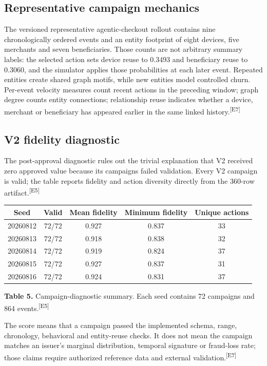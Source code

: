 \documentclass[11pt,a4paper,oneside]{article}
\newcommand{\evidence}[1]{\textsuperscript{\textcolor{EvidenceGray}{[#1]}}}
\newcommand{\fixedtablecaption}[3]{%
  \par\smallskip\phantomsection\hypertarget{#1}{}\label{#1}\begin{minipage}{\linewidth}\small\textbf{Table #2.} #3\end{minipage}\par\smallskip}
\begin{document}
\subsection{Representative campaign mechanics}
The versioned representative agentic-checkout rollout contains nine chronologically ordered events and an entity footprint of eight devices, five merchants and seven beneficiaries. Those counts are not arbitrary summary labels: the selected action sets device reuse to 0.3493 and beneficiary reuse to 0.3060, and the simulator applies those probabilities at each later event. Repeated entities create shared graph motifs, while new entities model controlled churn. Per-event velocity measures count recent actions in the preceding window; graph degree counts entity connections; relationship reuse indicates whether a device, merchant or beneficiary has appeared earlier in the same linked history.\evidence{E7}

\subsection{V2 fidelity diagnostic}
The post-approval diagnostic rules out the trivial explanation that V2 received zero approved value because its campaigns failed validation. Every V2 campaign is valid; the table reports fidelity and action diversity directly from the 360-row artifact.\evidence{E5}

\begin{table}[H]
\centering\small
\begin{tabular}{ccccc}
\toprule
\textbf{Seed} & \textbf{Valid} & \textbf{Mean fidelity} & \textbf{Minimum fidelity} & \textbf{Unique actions} \\
\midrule
20260812 & 72/72 & 0.927 & 0.837 & 33 \\
20260813 & 72/72 & 0.918 & 0.838 & 32 \\
20260814 & 72/72 & 0.919 & 0.824 & 37 \\
20260815 & 72/72 & 0.927 & 0.837 & 31 \\
20260816 & 72/72 & 0.924 & 0.831 & 37 \\
\bottomrule
\end{tabular}
\fixedtablecaption{tab:fidelity}{5}{Campaign-diagnostic summary. Each seed contains 72 campaigns and 864 events.\evidence{E5}}
\end{table}

The score means that a campaign passed the implemented schema, range, chronology, behavioral and entity-reuse checks. It does not mean the campaign matches an issuer's marginal distribution, temporal signature or fraud-loss rate; those claims require authorized reference data and external validation.\evidence{E7}\cite{sajja2026synthetic}
\end{document}
